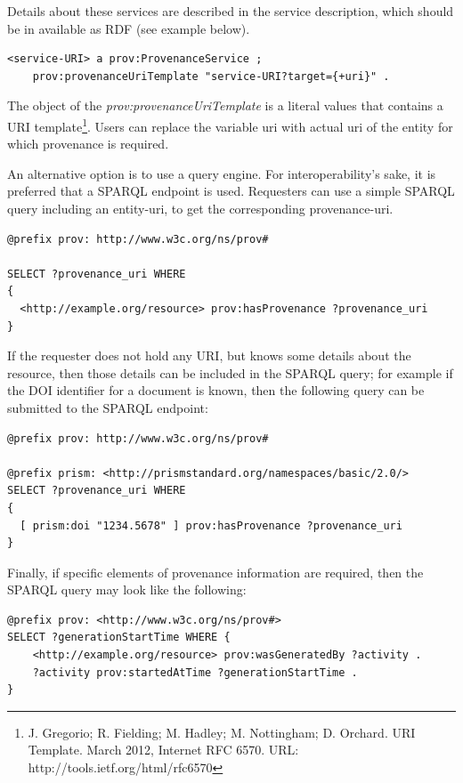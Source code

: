 Details about these services are described in the service description, which should be in available as RDF (see example below).

\begin{verbatim}
<service-URI> a prov:ProvenanceService ;
    prov:provenanceUriTemplate "service-URI?target={+uri}" .
\end{verbatim}

The object of the \emph{prov:provenanceUriTemplate} is a literal values that contains a URI template\footnote{J. Gregorio; R. Fielding; M. Hadley; M. Nottingham; D. Orchard. URI Template. March 2012, Internet RFC 6570. URL: http://tools.ietf.org/html/rfc6570}. Users can replace the variable uri with actual uri of the entity for which provenance is required.

An alternative option is to use a query engine. For interoperability's sake, it is preferred that a SPARQL endpoint is used. Requesters can use a simple SPARQL query including an entity-uri, to get the corresponding provenance-uri.

\begin{verbatim}
@prefix prov: http://www.w3c.org/ns/prov#

SELECT ?provenance_uri WHERE
{
  <http://example.org/resource> prov:hasProvenance ?provenance_uri
}

\end{verbatim}

If the requester does not hold any URI, but knows some details about the resource, then those details can be included in the SPARQL query; for example if the DOI identifier for a document is known, then the following query can be submitted to the SPARQL  endpoint:

\begin{verbatim}
@prefix prov: http://www.w3c.org/ns/prov#

@prefix prism: <http://prismstandard.org/namespaces/basic/2.0/>
SELECT ?provenance_uri WHERE
{
  [ prism:doi "1234.5678" ] prov:hasProvenance ?provenance_uri
}
\end{verbatim}

Finally, if specific elements of provenance information are required, then the SPARQL query may look like the following:

\begin{verbatim}
@prefix prov: <http://www.w3c.org/ns/prov#>
SELECT ?generationStartTime WHERE {
    <http://example.org/resource> prov:wasGeneratedBy ?activity .
    ?activity prov:startedAtTime ?generationStartTime .
}

\end{verbatim}


